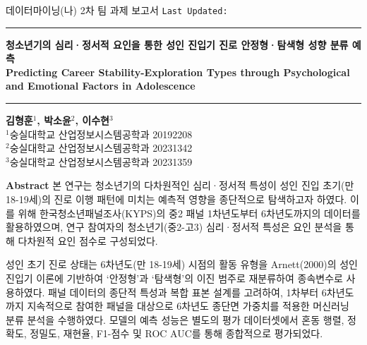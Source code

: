 \begin{center}
  \thispagestyle{empty}

  \noindent 데이터마이닝(나) 2차 팀 과제 보고서 \hfill \small \makeatletter\texttt{Last Updated: \@date}\makeatother \\
  \noindent\rule{\textwidth}{0.5pt}\par

  \vspace{2em}

  \huge \textbf{청소년기의 심리·정서적 요인을 통한 성인 진입기 진로 안정형·탐색형 성향 분류 예측} %
  \vspace{0.5em}
  \\
  \large \textbf{Predicting Career Stability-Exploration Types through Psychological and Emotional Factors in Adolescence} \\

  \vspace{1em}
  \noindent\rule{\textwidth}{0.5pt}\par

  \vspace{1em}

  \small \textbf{김형훈$^1$, 박소윤$^2$, 이수현$^3$}
  \vspace{0.5em}
  \\
  \small $^1$숭실대학교 산업정보시스템공학과 20192208 \\
  \small $^2$숭실대학교 산업정보시스템공학과 20231342 \\
  \small $^3$숭실대학교 산업정보시스템공학과 20231359

  \vspace{1em}

  \noindent\textbf{Abstract}
  본 연구는 청소년기의 다차원적인 심리·정서적 특성이 성인 진입 초기(만 18-19세)의 진로 이행 패턴에 미치는 예측적 영향을 종단적으로 탐색하고자 하였다. 이를 위해 한국청소년패널조사(KYPS)의 중2 패널 1차년도부터 6차년도까지의 데이터를 활용하였으며, 연구 참여자의 청소년기(중2-고3) 심리·정서적 특성은 요인 분석을 통해 다차원적 요인 점수로 구성되었다.

  성인 초기 진로 상태는 6차년도(만 18-19세) 시점의 활동 유형을 Arnett(2000)의 성인 진입기 이론에 기반하여 ‘안정형’과 ‘탐색형’의 이진 범주로 재분류하여 종속변수로 사용하였다. 패널 데이터의 종단적 특성과 복합 표본 설계를 고려하여, 1차부터 6차년도까지 지속적으로 참여한 패널을 대상으로 6차년도 종단면 가중치를 적용한 머신러닝 분류 분석을 수행하였다. 모델의 예측 성능은 별도의 평가 데이터셋에서 혼동 행렬, 정확도, 정밀도, 재현율, F1-점수 및 ROC AUC를 통해 종합적으로 평가되었다.


\end{center}
